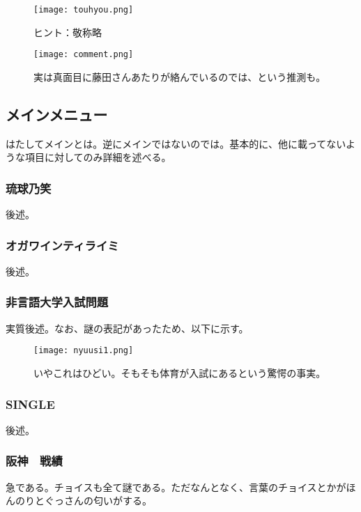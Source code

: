 \begin{figure}[H]
  \centering
  \texttt{[image: touhyou.png]}
  \caption{ヒント：敬称略}
\label{touhyou}
\end{figure}

\begin{figure}[H]
  \centering
  \texttt{[image: comment.png]}
  \caption{実は真面目に藤田さんあたりが絡んでいるのでは、という推測も。}
\label{comment}
\end{figure}



\newpage
\subsection{メインメニュー}
はたしてメインとは。逆にメインではないのでは。基本的に、他に載ってないような項目に対してのみ詳細を述べる。

\subsubsection{琉球乃笑}
後述。\par
\subsubsection{オガワインティライミ}
後述。\par
\subsubsection{非言語大学入試問題}
実質後述。なお、謎の表記があったため、以下に示す。

\begin{figure}[H]
  \centering
  \texttt{[image: nyuusi1.png]}
  \caption{いやこれはひどい。そもそも体育が入試にあるという驚愕の事実。}
\label{nyuusi1}
\end{figure}

\subsubsection{SINGLE}
後述。
\subsubsection{阪神　戦績}
急である。チョイスも全て謎である。ただなんとなく、言葉のチョイスとかがほんのりとぐっさんの匂いがする。

